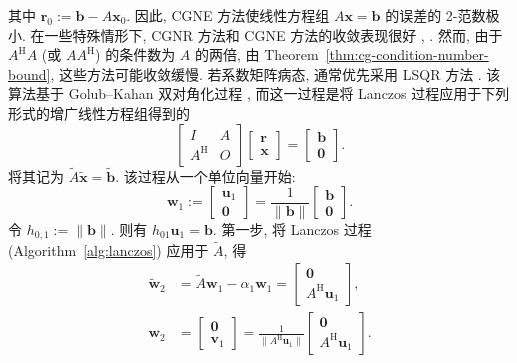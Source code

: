 {其中 $\bm r_0:=\bm b-A\bm x_0$. 因此, CGNE 方法使线性方程组 $A\bm x=\bm b$ 的误差的 2-范数极小.}
{在一些特殊情形下, CGNR 方法和 CGNE 方法的收敛表现很好 , . 然而, 由于 $A^{\mathrm H}A$ (或 $AA^{\mathrm H}$) 的条件数为 $A$ 的两倍, 由 Theorem\ \ref{thm:cg-condition-number-bound}, 这些方法可能收敛缓慢.}
{\leavevmode{}\label{idx:chapter-03-section-04:lsqr-augmented-system}若系数矩阵病态, 通常优先采用 LSQR 方法 . 该算法基于 Golub--Kahan 双对角化过程 , 而这一过程是将 Lanczos 过程应用于下列形式的增广线性方程组得到的}
\[\begin{bmatrix}I&A\\A^{\mathrm H}&O\end{bmatrix}\begin{bmatrix}\bm r\\\bm x\end{bmatrix}=\begin{bmatrix}\bm b\\\bm0\end{bmatrix}.\]
{将其记为 $\widetilde A\widetilde{\bm x}=\widetilde{\bm b}$. 该过程从一个单位向量开始:}
\[\bm w_1:=\begin{bmatrix}\bm u_1\\\bm0\end{bmatrix}=\frac1{\|\bm b\|}\begin{bmatrix}\bm b\\\bm0\end{bmatrix}.\]
{令 $h_{0,1}:=\|\bm b\|$. 则有 $h_{01}\bm u_1=\bm b$. 第一步, 将 Lanczos 过程 (Algorithm\ \ref{alg:lanczos}) 应用于 $\widetilde A$, 得}
\[\begin{aligned}\widetilde{\bm w}_2&=\widetilde A\bm w_1-\alpha_1\bm w_1=\begin{bmatrix}\bm0\\A^{\mathrm H}\bm u_1\end{bmatrix},\\
\bm w_2&=\begin{bmatrix}\bm0\\\bm v_1\end{bmatrix}=\frac1{\|A^{\mathrm H}\bm u_1\|}\begin{bmatrix}\bm0\\A^{\mathrm H}\bm u_1\end{bmatrix}.\end{aligned}\]

